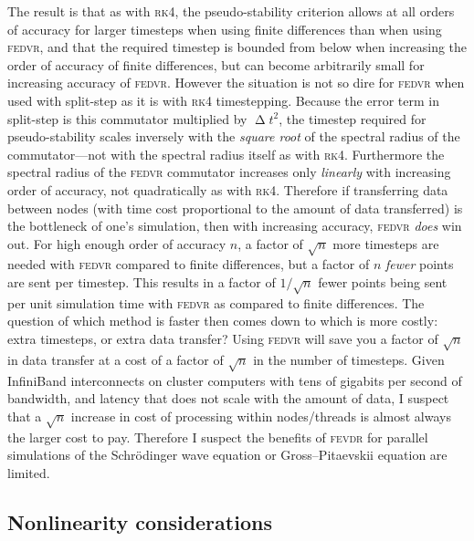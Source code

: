 The result is that as with \textsc{rk4}, the pseudo-stability criterion allows at all orders of accuracy for larger timesteps when using finite differences than when using \textsc{fedvr}, and that the required timestep is bounded from below when increasing the order of accuracy of finite differences, but can become arbitrarily small for increasing accuracy of \textsc{fedvr}. However the situation is not so dire for \textsc{fedvr} when used with split-step as it is with \textsc{rk4} timestepping. Because the error term in split-step is this commutator multiplied by $\upDelta t^2$, the timestep required for pseudo-stability scales inversely with the \emph{square root} of the spectral radius of the commutator---not with the spectral radius itself as with \textsc{rk4}. Furthermore the spectral radius of the \textsc{fedvr} commutator increases only \emph{linearly} with increasing order of accuracy, not quadratically as with \textsc{rk4}. Therefore if transferring data between nodes (with time cost proportional to the amount of data transferred) is the bottleneck of one's simulation, then with increasing accuracy, \textsc{fedvr} \emph{does} win out. For high enough order of accuracy $n$, a factor of $\sqrt{n}$ more timesteps are needed with \textsc{fedvr} compared to finite differences, but a factor of $n$ \emph{fewer} points are sent per timestep. This results in a factor of $1/\sqrt{n}$ fewer points being sent per unit simulation time with \textsc{fedvr} as compared to finite differences. The question of which method is faster then comes down to which is more costly: extra timesteps, or extra data transfer? Using \textsc{fedvr} will save you a factor of $\sqrt{n}$ in data transfer at a cost of a factor of $\sqrt{n}$ in the number of timesteps. Given InfiniBand interconnects on cluster computers with tens of gigabits per second of bandwidth, and latency that does not scale with the amount of data, I suspect that a $\sqrt{n}$ increase in cost of processing within nodes/threads is almost always the larger cost to pay. Therefore I suspect the benefits of \textsc{fevdr} for parallel simulations of the Schr\"odinger wave equation or Gross--Pitaevskii equation are limited.

\subsection{Nonlinearity considerations}

